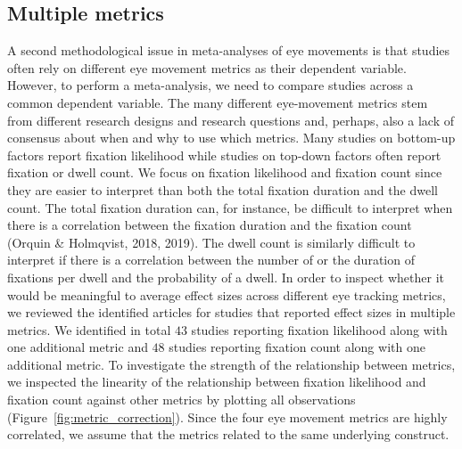 \documentclass{article}
\begin{document}
\subsection{Multiple metrics}

A second methodological issue in meta-analyses of eye movements is that studies often rely on different eye movement metrics as their dependent variable. However, to perform a meta-analysis, we need to compare studies across a common dependent variable. The many different eye-movement metrics stem from different research designs and research questions and, perhaps, also a lack of consensus about when and why to use which metrics. Many studies on bottom-up factors report fixation likelihood while studies on top-down factors often report fixation or dwell count. We focus on fixation likelihood and fixation count since they are easier to interpret than both the total fixation duration and the dwell count. The total fixation duration can, for instance, be difficult to interpret when there is a correlation between the fixation duration and the fixation count (Orquin \& Holmqvist, 2018, 2019). The dwell count is similarly difficult to interpret if there is a correlation between the number of or the duration of fixations per dwell and the probability of a dwell. In order to inspect whether it would be meaningful to average effect sizes across different eye tracking metrics, we reviewed the identified articles for studies that reported effect sizes in multiple metrics. We identified in total $43$ studies reporting fixation likelihood along with one additional metric and $48$ studies reporting fixation count along with one additional metric. To investigate the strength of the relationship between metrics, we inspected the linearity of the relationship between fixation likelihood and fixation count against other metrics by plotting all observations (Figure~\ref{fig:metric_correction}). Since the four eye movement metrics are highly correlated, we assume that the metrics related to the same underlying construct. 
\end{document}
